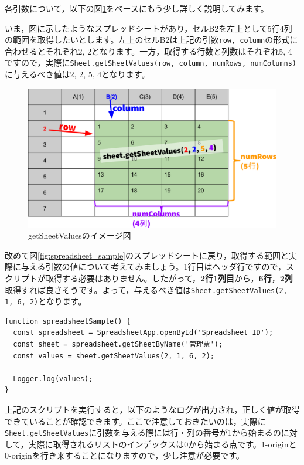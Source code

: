 \documentclass[uplatex,a4j]{jsarticle}
\begin{document}
各引数について，以下の図\ref{fig:getsheetvalues_image}をベースにもう少し詳しく説明してみます。


いま，図に示したようなスプレッドシートがあり，セルB2を左上として5行4列の範囲を取得したいとします。左上のセルB2は上記の引数\verb|row, column|の形式に合わせるとそれぞれ2, 2となります。一方，取得する行数と列数はそれぞれ5, 4ですので，実際に\verb|Sheet.getSheetValues(row, column, numRows, numColumns)|に与えるべき値は2, 2, 5, 4となります。

\begin{figure}[H]
 \centering
 \includegraphics[keepaspectratio, scale=0.7]{images/getsheetvalues_image.pdf}
 \caption{getSheetValuesのイメージ図}
 \label{fig:getsheetvalues_image}
\end{figure}

改めて図\ref{fig:spreadsheet_sample}のスプレッドシートに戻り，取得する範囲と実際に与える引数の値について考えてみましょう。1行目はヘッダ行ですので，スクリプトが取得する必要はありません。したがって，\textbf{2行1列目}から，\textbf{6行}，\textbf{2列}取得すれば良さそうです。よって，与えるべき値は\verb|Sheet.getSheetValues(2, 1, 6, 2)|となります。

\begin{lstlisting}[basicstyle=\ttfamily\footnotesize,frame=single,caption=SpreadsheetApp sample 4]
function spreadsheetSample() {
  const spreadsheet = SpreadsheetApp.openById('Spreadsheet ID');
  const sheet = spreadsheet.getSheetByName('管理票');
  const values = sheet.getSheetValues(2, 1, 6, 2);
  
  Logger.log(values);
}
\end{lstlisting}

上記のスクリプトを実行すると，以下のようなログが出力され，正しく値が取得できていることが確認できます。ここで注意しておきたいのは，実際に\verb|Sheet.getSheetValues|に引数を与える際には行・列の番号が1から始まるのに対して，実際に取得されるリストのインデックスは0から始まる点です。1-originと0-originを行き来することになりますので，少し注意が必要です。
\end{document}
